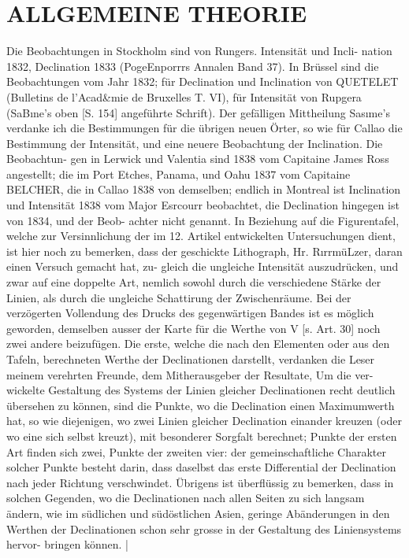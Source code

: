 \documentclass[12pt,a4paper]{article}
\begin{document}
\section*{ALLGEMEINE THEORIE}
Die Beobachtungen in Stockholm sind von Rungers. Intensität und Incli- nation 1832, Declination 1833 (PogeEnporrrs Annalen Band 37). In Brüssel sind die Beobachtungen vom Jahr 1832; für Declination und Inclination von QUETELET (Bulletins de l'Acad\&mie de Bruxelles T. VI), für Intensität von Rupgera (SaB\i{}ne's oben [S. 154] angeführte Schrift). Der gefälligen Mittheilung Sas\i{}me's verdanke ich die Bestimmungen für die übrigen neuen Örter, so wie für Callao die Bestimmung der Intensität, und eine neuere Beobachtung der Inclination. Die Beobachtun- gen in Lerwick und Valentia sind 1838 vom Capitaine James Ross angestellt; die im Port Etches, Panama, und Oahu 1837 vom Capitaine BELCHER, die in Callao 1838 von demselben; endlich in Montreal ist Inclination und Intensität 1838 vom Major Esrcourr beobachtet, die Declination hingegen ist von 1834, und der Beob- achter nicht genannt. In Beziehung auf die Figurentafel, welche zur Versinnlichung der im 12. Artikel entwickelten Untersuchungen dient, ist hier noch zu bemerken, dass der geschickte Lithograph, Hr. R\i{}rrmüLzer, daran einen Versuch gemacht hat, zu- gleich die ungleiche Intensität auszudrücken, und zwar auf eine doppelte Art, nemlich sowohl durch die verschiedene Stärke der Linien, als durch die ungleiche Schattirung der Zwischenräume. Bei der verzögerten Vollendung des Drucks des gegenwärtigen Bandes ist es möglich geworden, demselben ausser der Karte für die Werthe von V [s. Art. 30] noch zwei andere beizufügen. Die erste, welche die nach den Elementen oder aus den Tafeln, berechneten Werthe der Declinationen darstellt, verdanken die Leser meinem verehrten Freunde, dem Mitherausgeber der Resultate, Um die ver- wickelte Gestaltung des Systems der Linien gleicher Declinationen recht deutlich übersehen zu können, sind die Punkte, wo die Declination einen Maximumwerth hat, so wie diejenigen, wo zwei Linien gleicher Declination einander kreuzen (oder wo eine sich selbst kreuzt), mit besonderer Sorgfalt berechnet; Punkte der ersten Art finden sich zwei, Punkte der zweiten vier: der gemeinschaftliche Charakter solcher Punkte besteht darin, dass daselbst das erste Differential der Declination nach jeder Richtung verschwindet. Übrigens ist überflüssig zu bemerken, dass in solchen Gegenden, wo die Declinationen nach allen Seiten zu sich langsam ändern, wie im südlichen und südöstlichen Asien, geringe Abänderungen in den Werthen der Declinationen schon sehr grosse in der Gestaltung des Liniensystems hervor- bringen können. |
\end{document}
